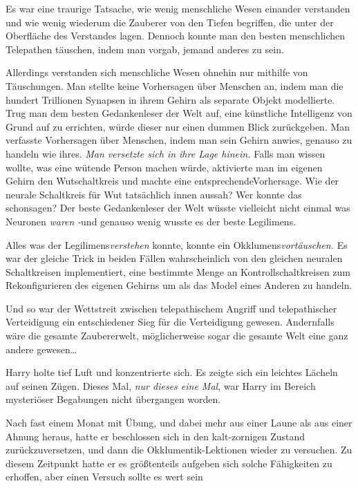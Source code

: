 {Es war eine traurige Tatsache, wie wenig menschliche Wesen einander verstanden und wie wenig wiederum die Zauberer von den Tiefen begriffen, die unter der Oberfläche des Verstandes lagen. Dennoch konnte man den besten menschlichen Telepathen täuschen, indem man vorgab, jemand anderes zu sein.

Allerdings verstanden sich menschliche Wesen ohnehin nur mithilfe von Täuschungen. Man stellte keine Vorhersagen über Menschen an, indem man die hundert Trillionen Synapsen in ihrem Gehirn als separate Objekt modellierte. Trug man dem besten Gedankenleser der Welt auf, eine künstliche Intelligenz von Grund auf zu errichten, würde dieser nur einen dummen Blick zurückgeben. Man verfasste Vorhersagen über Menschen, indem man sein Gehirn anwies, genauso zu handeln wie ihres. \emph{Man versetzte sich in ihre Lage hinein.} Falls man wissen wollte, was eine wütende Person machen würde, aktivierte man im eigenen Gehirn den Wutschaltkreis und machte eine entsprechendeVorhersage. Wie der neurale Schaltkreis für Wut tatsächlich innen aussah? Wer konnte das schonsagen? Der beste Gedankenleser der Welt wüsste vielleicht nicht einmal was Neuronen \emph{waren} \emph{-}und genauso wenig wusste es der beste Legilimens.

Alles was der Legilimens\emph{verstehen} konnte, konnte ein Okklumens\emph{vortäuschen.} Es war der gleiche Trick in beiden Fällen \later wahrscheinlich von den gleichen neuralen Schaltkreisen implementiert, eine bestimmte Menge an Kontrollschaltkreisen zum Rekonfigurieren des eigenen Gehirns um als das Model eines Anderen zu handeln.

Und so war der Wettstreit zwischen telepathischem Angriff und telepathischer Verteidigung ein entschiedener Sieg für die Verteidigung gewesen. Andernfalls wäre die gesamte Zaubererwelt, möglicherweise sogar die gesamte Welt eine ganz andere gewesen…

Harry holte tief Luft und konzentrierte sich. Es zeigte sich ein leichtes Lächeln auf seinen Zügen. Dieses Mal, \emph{nur dieses eine Mal}, war Harry im Bereich mysteriöser Begabungen nicht übergangen worden.

Nach fast einem Monat mit Übung, und dabei mehr aus einer Laune als aus einer Ahnung heraus, hatte er beschlossen sich in den kalt-zornigen Zustand zurückzuversetzen, und dann die Okklumentik-Lektionen wieder zu versuchen. Zu diesem Zeitpunkt hatte er es größtenteils aufgeben sich solche Fähigkeiten zu erhoffen, aber einen Versuch sollte es wert sein \later

}
